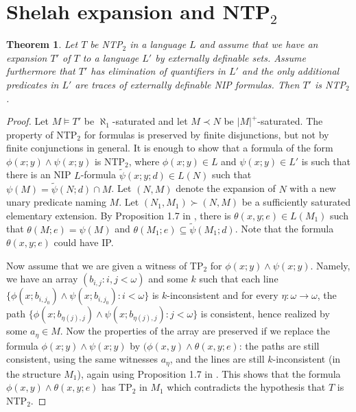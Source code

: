 \documentclass[12pt]{article}
\newtheorem{thm}{Theorem}[section]
\theoremstyle{definition}
\theoremstyle{mystyle}
\theoremstyle{remark}
\begin{document}
\appendix

\section{Shelah expansion and NTP$_2$}


\begin{thm}\label{th_shelahexp}
Let $T$ be NTP$_2$ in a language $L$ and assume that we have an expansion $T'$ of $T$ to a  language $L'$ by externally definable sets. Assume furthermore that $T'$ has elimination of quantifiers in $L'$ and the only additional predicates in $L'$ are traces of externally definable NIP formulas. Then $T'$ is NTP$_2$.
\end{thm}
\begin{proof}
Let $M\models T'$ be $\aleph_1$-saturated and let $M\prec N$ be $|M|^+$-saturated. The property of NTP$_2$ for formulas is preserved by finite disjunctions, but not by finite conjunctions in general. It is enough to show that a formula of the form $\phi(x;y)\wedge \psi(x;y)$ is NTP$_2$, where $\phi(x;y)\in L$ and $\psi(x;y) \in L'$ is such that there is an NIP $L$-formula $\tilde \psi(x;y;d)\in L(N)$ such that $\psi(M)=\tilde \psi(N;d)\cap M$. Let $(N,M)$ denote the expansion of $N$ with a new unary predicate naming $M$. Let $(N_1,M_1)\succ (N,M)$ be a sufficiently saturated elementary extension. By Proposition 1.7 in \cite{ChSi2}, there is $\theta(x,y;e)\in L(M_1)$ such that $\theta(M;e)=\psi(M)$ and $\theta(M_1;e)\subseteq \tilde \psi(M_1;d)$. Note that the formula $\theta(x,y;e)$ could have IP.

Now assume that we are given a witness of TP$_2$ for $\phi(x;y)\wedge \psi(x;y)$. Namely, we have an array $(b_{i,j}:i,j<\omega)$ and some $k$ such that each line $\{\phi(x;b_{i,j_0})\wedge \psi(x;b_{i,j_0}):i<\omega\}$ is $k$-inconsistent and for every $\eta:\omega \to \omega$, the path $\{\phi(x;b_{\eta(j),j})\wedge \psi(x;b_{\eta(j),j}):j<\omega\}$ is consistent, hence realized by some $a_\eta\in M$. Now the properties of the array are preserved if we replace the formula $\phi(x;y)\wedge \psi(x;y)$ by $(\phi(x,y)\wedge \theta(x,y;e)$: the paths are still consistent, using the same witnesses $a_\eta$, and the lines are still $k$-inconsistent (in the structure $M_1$), again using Proposition 1.7 in \cite{ChSi2}. This shows that the formula $\phi(x,y)\wedge \theta(x,y;e)$ has TP$_2$ in $M_1$ which contradicts the hypothesis that $T$ is NTP$_2$.
\end{proof}

%

\end{document}
